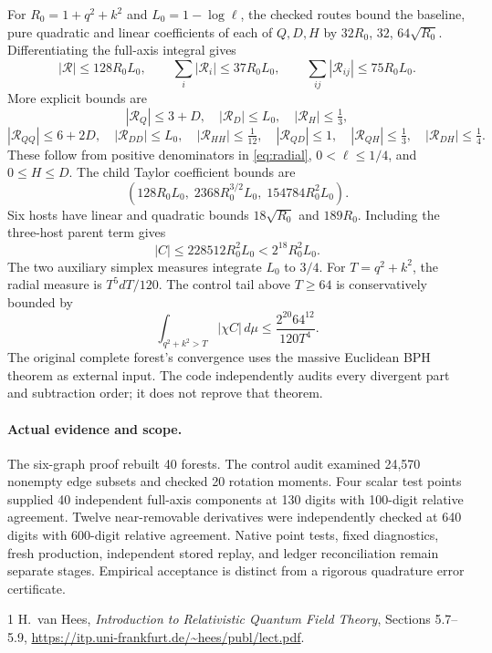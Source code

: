 \documentclass[11pt]{article}
\begin{document}
For $R_0=1+q^2+k^2$ and $L_0=1-\log\ell$, the checked routes bound the baseline, pure quadratic and linear coefficients of each of $Q,D,H$ by $32R_0$, $32$, $64\sqrt{R_0}$.
Differentiating the full-axis integral gives
\[
 |\mathcal R|\le128R_0L_0,\qquad
 \sum_i|\mathcal R_i|\le37R_0L_0,\qquad
 \sum_{ij}|\mathcal R_{ij}|\le75R_0L_0.
\]
More explicit bounds are
\[
 |\mathcal R_Q|\le3+D,\quad |\mathcal R_D|\le L_0,\quad
 |\mathcal R_H|\le\tfrac13,
\]
\[
 |\mathcal R_{QQ}|\le6+2D,\quad|\mathcal R_{DD}|\le L_0,\quad
 |\mathcal R_{HH}|\le\tfrac1{12},\quad
 |\mathcal R_{QD}|\le1,\quad
 |\mathcal R_{QH}|\le\tfrac13,\quad
 |\mathcal R_{DH}|\le\tfrac14.
\]
These follow from positive denominators in \eqref{eq:radial}, $0<\ell\le1/4$, and $0\le H\le D$.
The child Taylor coefficient bounds are
\[
 (128R_0L_0,\;2368R_0^{3/2}L_0,\;154784R_0^2L_0).
\]
Six hosts have linear and quadratic bounds $18\sqrt{R_0}$ and $189R_0$.
Including the three-host parent term gives
\[
 |C|\le228512R_0^2L_0<2^{18}R_0^2L_0.
\]
The two auxiliary simplex measures integrate $L_0$ to $3/4$.
For $T=q^2+k^2$, the radial measure is $T^5dT/120$.
The control tail above $T\ge64$ is conservatively bounded by
\[
 \int_{q^2+k^2>T}|\chi C|\,d\mu
 \le \frac{2^{20}64^{12}}{120T^4}.
\]
The original complete forest's convergence uses the massive Euclidean BPH theorem as external input. The code independently audits every divergent part and subtraction order; it does not reprove that theorem.

\paragraph{Actual evidence and scope.}
The six-graph proof rebuilt 40 forests. The control audit examined 24,570 nonempty edge subsets and checked 20 rotation moments. Four scalar test points supplied 40 independent full-axis components at 130 digits with 100-digit relative agreement. Twelve near-removable derivatives were independently checked at 640 digits with 600-digit relative agreement.
Native point tests, fixed diagnostics, fresh production, independent stored replay, and ledger reconciliation remain separate stages. Empirical acceptance is distinct from a rigorous quadrature error certificate.

\begin{thebibliography}{1}
 H.~van Hees, \emph{Introduction to Relativistic Quantum Field Theory}, Sections 5.7--5.9,
\url{https://itp.uni-frankfurt.de/~hees/publ/lect.pdf}.
\end{thebibliography}
\end{document}
